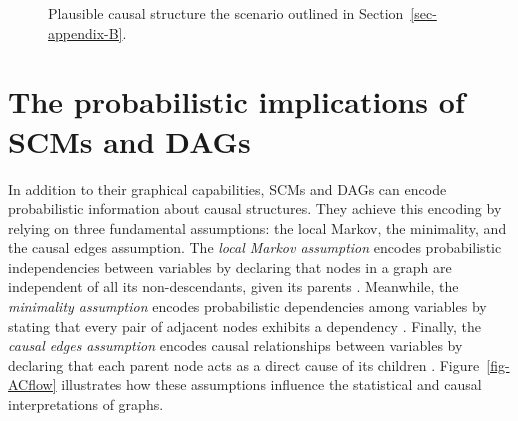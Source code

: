 \documentclass[
  authoryear,
  review,
  1p]{elsarticle}
\begin{document}
\begin{figure}

\begin{minipage}{0.50\linewidth}

\centering{

\[
\begin{aligned}
  X & := f_{X}(e_{X}) \\
  T & := f_{Z}(X,e_{T}) \\
  Y & := f_{Y}(T,X,e_{Y}) \\
  e_{T} & \perp\!\!\!\perp e_{X} \\
  e_{T} & \perp\!\!\!\perp e_{Y} \\
  e_{X} & \perp\!\!\!\perp e_{Y}
\end{aligned}
\]

}


\end{minipage}%
%
\begin{minipage}{0.50\linewidth}



\end{minipage}%

\caption{\label{fig-example}Plausible causal structure the scenario
outlined in Section~\ref{sec-appendix-B}.}

\end{figure}%

\section{The probabilistic implications of SCMs and
DAGs}\label{sec-appendix-D}

In addition to their graphical capabilities, SCMs and DAGs can encode
probabilistic information about causal structures. They achieve this
encoding by relying on three fundamental assumptions: the local Markov,
the minimality, and the causal edges assumption. The \emph{local Markov
assumption} encodes probabilistic independencies between variables by
declaring that nodes in a graph are independent of all its
non-descendants, given its parents \citep{Neal_2020}. Meanwhile, the
\emph{minimality assumption} encodes probabilistic dependencies among
variables by stating that every pair of adjacent nodes exhibits a
dependency \citep{Neal_2020}. Finally, the \emph{causal edges
assumption} encodes causal relationships between variables by declaring
that each parent node acts as a direct cause of its children
\citep{Neal_2020}. Figure~\ref{fig-ACflow} illustrates how these
assumptions influence the statistical and causal interpretations of
graphs.
\end{document}
